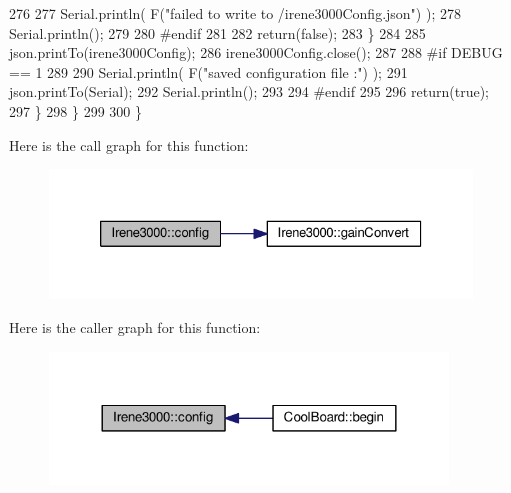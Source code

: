 \begin{DoxyCode}
276 
277                 Serial.println( F(\textcolor{stringliteral}{"failed to write to /irene3000Config.json"}) );
278                 Serial.println();
279             
280 \textcolor{preprocessor}{            #endif }
281 
282                 \textcolor{keywordflow}{return}(\textcolor{keyword}{false});
283             \}
284 
285             json.printTo(irene3000Config);
286             irene3000Config.close();
287             
288 \textcolor{preprocessor}{        #if DEBUG == 1 }
289 
290             Serial.println( F(\textcolor{stringliteral}{"saved configuration file :"})  );
291             json.printTo(Serial);
292             Serial.println();
293         
294 \textcolor{preprocessor}{        #endif}
295 
296             \textcolor{keywordflow}{return}(\textcolor{keyword}{true}); 
297         \}
298     \}   
299 
300 \}
\end{DoxyCode}
Here is the call graph for this function\+:\nopagebreak
\begin{figure}[H]
\begin{center}
\leavevmode
\includegraphics[width=326pt]{classIrene3000_afed5c35e4b23963c157847ef27c11e9c_cgraph}
\end{center}
\end{figure}
Here is the caller graph for this function\+:\nopagebreak
\begin{figure}[H]
\begin{center}
\leavevmode
\includegraphics[width=300pt]{classIrene3000_afed5c35e4b23963c157847ef27c11e9c_icgraph}
\end{center}
\end{figure}
\mbox{\label{classIrene3000_abcad62d1201a59f8dd3ba87048002728}} 
